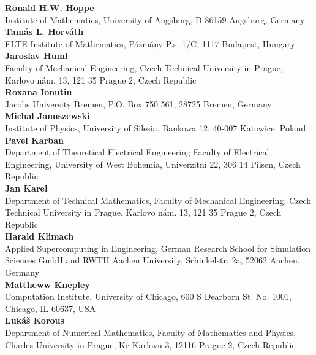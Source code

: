 \noindent
{\bf Ronald H.W. Hoppe}\\
Institute of Mathematics,
University of Augsburg,
D-86159 Augsburg,
Germany\\

\noindent
{\bf Tam\'as L. Horv\'ath}\\
ELTE Institute of Mathematics,
P\'azm\'any P.s. 1/C,
1117 Budapest,
Hungary\\

\noindent
{\bf Jaroslav Huml}\\
Faculty of Mechanical Engineering,
Czech Technical University in Prague,
Karlovo n\'am. 13,
121 35 Prague 2,
Czech Republic\\

\noindent
{\bf Roxana Ionutiu}\\
Jacobs University Bremen,
P.O. Box 750 561,
28725 Bremen,
Germany\\

\noindent
{\bf Michal Januszewski}\\
Institute of Physics,
University of Silesia,
Bankowa 12,
40-007 Katowice,
Poland\\

\noindent
{\bf Pavel Karban}\\
Department of Theoretical Electrical Engineering
Faculty of Electrical Engineering,
University of West Bohemia,
Univerzitn\'{\i} 22,
306 14 Pilsen,
Czech Republic\\

\noindent
{\bf Jan Karel}\\
Department of Technical Mathematics,
Faculty of Mechanical Engineering,
Czech Technical University in Prague,
Karlovo n\'am. 13,
121 35 Prague 2,
Czech Republic\\

\noindent
{\bf Harald Klimach}\\
Applied Supercomputing in Engineering,
German Research School for Simulation Sciences GmbH and RWTH Aachen University,
Schinkelstr. 2a,
52062 Aachen,
Germany\\

\noindent
{\bf Mattheww Knepley}\\
Computation Institute,
University of Chicago,
600 S Dearborn St. No. 1001, 
Chicago,
IL 60637,
USA\\

\noindent
{\bf Luk\'a\v{s} Korous}\\
Department of Numerical Mathematics,
Faculty of Mathematics and Physics,
Charles University in Prague,
Ke Karlovu 3,
12116 Prague 2,
Czech Republic\\

